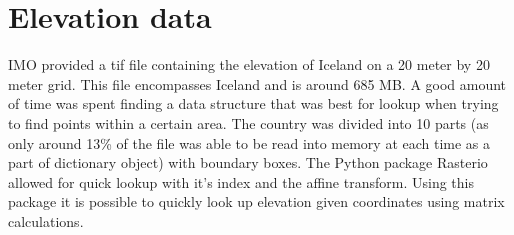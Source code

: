 \section{Elevation data}
IMO provided a tif file containing the elevation of Iceland on a 20 meter by 20 meter grid. This file encompasses Iceland and is around 685 MB. A good amount of time was spent finding a data structure that was best for lookup when trying to find points within a certain area. The country was divided into 10 parts (as only around 13\% of the file was able to be read into memory at each time as a part of dictionary object) with boundary boxes. The Python package Rasterio allowed for quick lookup with it's index and the affine transform. Using this package it is possible to quickly look up elevation given coordinates using matrix calculations.
